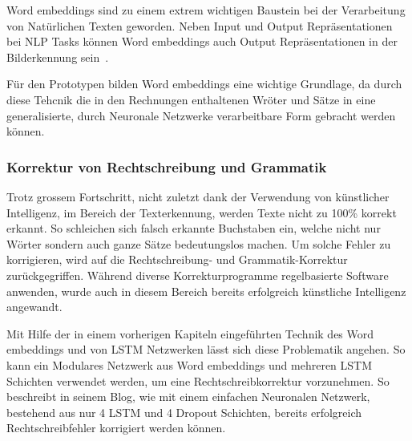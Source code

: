 \documentclass{hwz}
\begin{document}
Word embeddings sind zu einem extrem wichtigen Baustein bei der Verarbeitung von Natürlichen Texten geworden. Neben Input und Output Repräsentationen bei NLP Tasks können Word embeddings auch Output Repräsentationen in der Bilderkennung sein~\autocite{Olah2014DeepRepresentations}. 

Für den Prototypen bilden Word embeddings eine wichtige Grundlage, da durch diese Tehcnik die in den Rechnungen enthaltenen Wröter und Sätze in eine generalisierte, durch Neuronale Netzwerke verarbeitbare Form gebracht werden können.

\subsubsection{Korrektur von Rechtschreibung und Grammatik}

Trotz grossem Fortschritt, nicht zuletzt dank der Verwendung von künstlicher Intelligenz, im Bereich der Texterkennung, werden Texte nicht zu 100\% korrekt erkannt. So schleichen sich falsch erkannte Buchstaben ein, welche nicht nur Wörter sondern auch ganze Sätze bedeutungslos machen. Um solche Fehler zu korrigieren, wird auf die Rechtschreibung- und Grammatik-Korrektur zurückgegriffen. Während diverse Korrekturprogramme regelbasierte Software anwenden, wurde auch in diesem Bereich bereits erfolgreich künstliche Intelligenz angewandt.

Mit Hilfe der in einem vorherigen Kapiteln eingeführten Technik des Word embeddings und von LSTM Netzwerken lässt sich diese Problematik angehen. So kann ein Modulares Netzwerk aus Word embeddings und mehreren LSTM Schichten verwendet werden, um eine Rechtschreibkorrektur vorzunehmen. So beschreibt \textcite{Weiss2016DeepSpelling} in seinem Blog, wie mit einem einfachen Neuronalen Netzwerk, bestehend aus nur 4 LSTM und 4 Dropout Schichten, bereits erfolgreich Rechtschreibfehler korrigiert werden können. 
\end{document}
